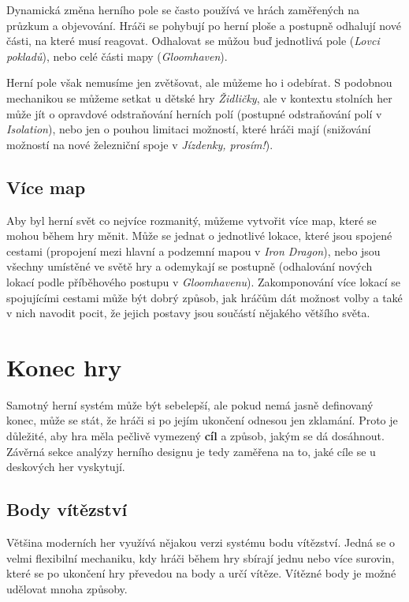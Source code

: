 Dynamická změna herního pole se často používá ve hrách zaměřených na průzkum a objevování. Hráči se pohybují po herní ploše a postupně odhalují nové části, na které musí reagovat. Odhalovat se můžou buď jednotlivá pole (\textit{Lovci pokladů}), nebo celé části mapy (\textit{Gloomhaven}).

Herní pole však nemusíme jen zvětšovat, ale můžeme ho i odebírat. S podobnou mechanikou se můžeme setkat u dětské hry \textit{Židličky}, ale v kontextu stolních her může jít o opravdové odstraňování herních polí (postupné odstraňování polí v \textit{Isolation}), nebo jen o pouhou limitaci možností, které hráči mají (snižování možností na nové železniční spoje v \textit{Jízdenky, prosím!}).

\subsection{Více map}
\label{subsec:movement_multiple_maps}

Aby byl herní svět co nejvíce rozmanitý, můžeme vytvořit více map, které se mohou během hry měnit. Může se jednat o jednotlivé lokace, které jsou spojené cestami (propojení mezi hlavní a podzemní mapou v \textit{Iron Dragon}), nebo jsou všechny umístěné ve světě hry a odemykají se postupně (odhalování nových lokací podle příběhového postupu v \textit{Gloomhavenu}). Zakomponování více lokací se spojujícími cestami může být dobrý způsob, jak hráčům dát možnost volby a také v nich navodit pocit, že jejich postavy jsou součástí nějakého většího světa.



\section{Konec hry}
\label{sec:end}

Samotný herní systém může být sebelepší, ale pokud nemá jasně definovaný konec, může se stát, že hráči si po jejím ukončení odnesou jen zklamání. Proto je důležité, aby hra měla pečlivě vymezený \textbf{cíl} a způsob, jakým se dá dosáhnout. Závěrná sekce analýzy herního designu je tedy zaměřena na to, jaké cíle se u deskových her vyskytují.

\subsection{Body vítězství}
\label{subsec:end_victory_points}

Většina moderních her využívá nějakou verzi systému bodu vítězství. Jedná se o velmi flexibilní mechaniku, kdy hráči během hry sbírají jednu nebo více surovin, které se po ukončení hry převedou na body a určí vítěze. Vítězné body je možné udělovat mnoha způsoby.

